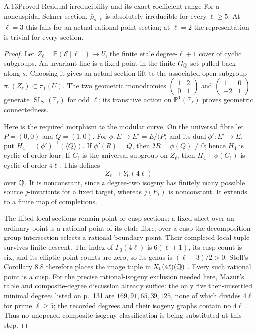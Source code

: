 \begin{statement}{A.13}{Proved}
{Residual irreducibility and its exact coefficient range}
For a noncuspidal Selmer section, $\bar\rho_{s,\ell}$ is absolutely
irreducible for every $\ell\ge5$.  At $\ell=3$ this fails for an actual
rational point section; at $\ell=2$ the representation is trivial for
every section.
\end{statement}
\begin{proof}
Let $Z_\ell=\mathbb P(\mathcal E[\ell])\to U$, the finite etale
degree-$\ell+1$ cover of cyclic subgroups.  An invariant line is a fixed
point in the finite $G_\mathbb Q$-set pulled back along $s$.  Choosing it gives
an actual section lift to the associated open subgroup
$\pi_1(Z_\ell)\subset\pi_1(U)$.  The two geometric monodromies
$\left(\begin{smallmatrix}1&2\\0&1\end{smallmatrix}\right)$ and
$\left(\begin{smallmatrix}1&0\\-2&1\end{smallmatrix}\right)$ generate
$\operatorname{SL}_2(\mathbb F_\ell)$ for odd $\ell$; its transitive
action on $\mathbb P^1(\mathbb F_\ell)$ proves geometric connectedness.

Here is the required morphism to the modular curve.  On the universal
fibre let $P=(0,0)$ and $Q=(1,0)$.  For
$\phi:E\to E'=E/\langle P\rangle$ and its dual
$\phi':E'\to E$, put $H_4=(\phi')^{-1}(\langle Q\rangle)$.
If $\phi'(R)=Q$, then $2R=\phi(Q)\ne0$; hence $H_4$ is cyclic of
order four.  If $C_\ell$ is the universal subgroup on $Z_\ell$, then
$H_4+\phi(C_\ell)$ is cyclic of order $4\ell$.  This defines
\[
             Z_\ell\longrightarrow Y_0(4\ell)
\tag{A.13.1}
\]
over $\mathbb Q$.  It is nonconstant, since a degree-two isogeny has finitely
many possible source $j$-invariants for a fixed target, whereas
$j(E_t)$ is nonconstant.  It extends to a finite map of completions.

The lifted local sections remain point or cusp sections: a fixed sheet
over an ordinary point is a rational point of its etale fibre; over a
cusp the decomposition-group intersection selects a rational boundary
point.  Their completed local tuple survives finite descent.  The index
of $\Gamma_0(4\ell)$ is $6(\ell+1)$, its cusp count is six, and its
elliptic-point counts are zero, so its genus is $(\ell-3)/2>0$.
Stoll's Corollary 8.8 therefore places the image tuple in
$X_0(4\ell)(\mathbb Q)$ \cite{LegStoll2007}.  Every such rational point is a
cusp.  For the precise rational-isogeny exclusion needed here, Mazur's
table and composite-degree discussion already suffice: the only five
then-unsettled minimal degrees listed on p.~131 are
$169,91,65,39,125$, none of which divides $4\ell$ for prime $\ell\ge5$;
the recorded degrees and their isogeny graphs contain no $4\ell$
\cite[pp.~129--131]{LegMazur1978}.  Thus no unopened composite-isogeny
classification is being substituted at this step.


\end{proof}
